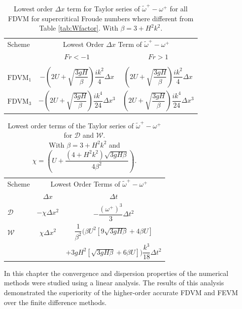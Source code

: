 \begin{table}
	\centering
	\begin{tabular}{l  c  c}
	\hline
		Scheme &\multicolumn{2}{c}{Lowest Order $\Delta x$ Term of $\widetilde{\omega}^+-\omega^+$} \T\B \\
			\cline{2-3} 
			& $Fr < - 1$&$ Fr >1$ \T\B  \\
		\hline & \\
		$\text{FDVM}_1$& $-\left(2U + \sqrt{\dfrac{3gH}{\beta}}\right)  \dfrac{ik^2}{4} \Delta x$ &  $\left(2U + \sqrt{\dfrac{3gH}{\beta}}\right)  \dfrac{ik^2}{4} \Delta x$  \T\B   \\
		$\text{FDVM}_3$& $-\left(2U + \sqrt{\dfrac{3gH}{\beta}} \right) \dfrac{ik^4}{24} \Delta x^3$ & $\left(2U + \sqrt{\dfrac{3gH}{\beta}} \right) \dfrac{ik^4}{24} \Delta x^3$  \T\B  \\
		\hline
	\end{tabular}
	\caption{Lowest order $\Delta x$ term for Taylor series of $\widetilde{\omega}^+-\omega^+$ for all FDVM for supercritical Froude numbers where different from Table \ref{tab:Wfactor}. With $\beta = 3 + H^2 k^2 $. }
	\label{tab:Wspatfactor} 
\end{table}
	
\begin{table}
	\centering
\begin{tabular}{l  c  c}
\hline
	Scheme & \multicolumn{2}{c}{Lowest Order Terms of $\widetilde{\omega}^+-\omega^+$} \T\B \\
	\cline{2-3}
	& $\Delta x$&$\Delta t$ \T\B \\
	\hline
	$\mathcal{D}$& $- \chi \Delta x^2$  &$ -\dfrac{\left(\omega^+\right)^3}{3}\Delta t^2$ \T\B  \\
	$\mathcal{W}$& $\chi\Delta x^2$  &$ \dfrac{1}{\beta^2}\Bigg( \beta U^2\left[9\sqrt{3gH \beta} + 4 \beta U\right]$ \\ & & $ + 3gH^2\left[\sqrt{3gH \beta} + 6 \beta U\right] \Bigg) \dfrac{k^3}{18 }\Delta t^2$  \T\B  \\ 
	\hline
\end{tabular}
	\caption{Lowest order terms of the Taylor series of $\widetilde{\omega}^+-\omega^+$ for $\mathcal{D}$ and $\mathcal{W}$. \\ With $\beta = 3 + H^2 k^2 $ and $\chi = \left(U + \dfrac{\left( 4 + H^2k^2\right)\sqrt{3gH\beta}}{4 \beta^2}\right)$. }
	\label{tab:WFDspatfactor} 
\end{table}
 
 \medskip
 
 In this chapter the convergence and dispersion properties of the numerical methods were studied using a linear analysis. The results of this analysis demonstrated the superiority of the higher-order accurate FDVM and FEVM over the finite difference methods.